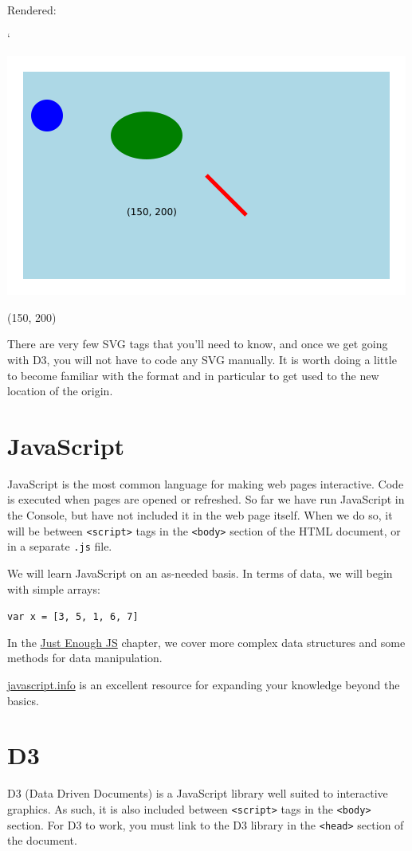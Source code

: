 \documentclass[
  openany]{book}
\begin{document}
Rendered:

`

\includegraphics[width=0.5\linewidth]{images/shapessvg}

(150, 200)

There are very few SVG tags that you'll need to know, and once we get going with D3, you will not have to code any SVG manually. It is worth doing a little to become familiar with the format and in particular to get used to the new location of the origin.

\hypertarget{javascript}{%
\section{\texorpdfstring{JavaScript }{JavaScript }}\label{javascript}}

JavaScript is the most common language for making web pages interactive. Code is executed when pages are opened or refreshed. So far we have run JavaScript in the Console, but have not included it in the web page itself. When we do so, it will be between \texttt{\textless{}script\textgreater{}} tags in the \texttt{\textless{}body\textgreater{}} section of the HTML document, or in a separate \texttt{.js} file.

We will learn JavaScript on an as-needed basis. In terms of data, we will begin with simple arrays:

\texttt{var\ x\ =\ {[}3,\ 5,\ 1,\ 6,\ 7{]}}

In the \href{just-enough-js.html}{Just Enough JS} chapter, we cover more complex data structures and some methods for data manipulation.

\href{https://javascript.info}{javascript.info} is an excellent resource for expanding your knowledge beyond the basics.

\hypertarget{d3}{%
\section{\texorpdfstring{D3 }{D3 }}\label{d3}}

D3 (Data Driven Documents) is a JavaScript library well suited to interactive graphics. As such, it is also included between \texttt{\textless{}script\textgreater{}} tags in the \texttt{\textless{}body\textgreater{}} section. For D3 to work, you must link to the D3 library in the \texttt{\textless{}head\textgreater{}} section of the document.
\end{document}

